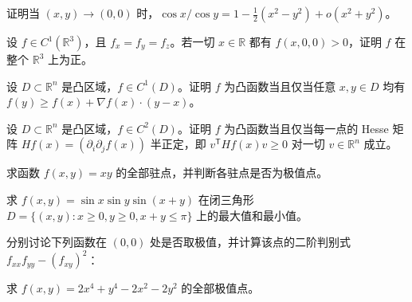 \noindent\begin{minipage}{\textwidth}
证明当 $(x,y)\to(0,0)$ 时，$\cos x/\cos y=1-\tfrac12(x^2-y^2)+o(x^2+y^2)$。
\end{minipage}\par\vfill
\noindent\begin{minipage}{\textwidth}
设 $f\in C^1(\mathbb R^3)$，且 $f_x=f_y=f_z$。若一切 $x\in\mathbb R$ 都有 $f(x,0,0)>0$，证明 $f$ 在整个 $\mathbb R^3$ 上为正。
\end{minipage}\par\vfill
\newpage
\noindent\begin{minipage}{\textwidth}
设 $D\subset\mathbb R^n$ 是凸区域，$f\in C^1(D)$。证明 $f$ 为凸函数当且仅当任意 $x,y\in D$ 均有 $f(y)\ge f(x)+\nabla f(x)\cdot(y-x)$。
\end{minipage}\par\vfill
\noindent\begin{minipage}{\textwidth}
设 $D\subset\mathbb R^n$ 是凸区域，$f\in C^2(D)$。证明 $f$ 为凸函数当且仅当每一点的 Hesse 矩阵 $Hf(x)=(\partial_i\partial_jf(x))$ 半正定，即 $v^{\mathsf T}Hf(x)v\ge0$ 对一切 $v\in\mathbb R^n$ 成立。
\end{minipage}\par\vfill
\noindent\begin{minipage}{\textwidth}
求函数 $f(x,y)=xy$ 的全部驻点，并判断各驻点是否为极值点。
\end{minipage}\par\vfill
\newpage
\noindent\begin{minipage}{\textwidth}
求 $f(x,y)=\sin x\sin y\sin(x+y)$ 在闭三角形 $D=\{(x,y):x\ge0,y\ge0,x+y\le\pi\}$ 上的最大值和最小值。
\end{minipage}\par\vfill
\noindent\begin{minipage}{\textwidth}
分别讨论下列函数在 $(0,0)$ 处是否取极值，并计算该点的二阶判别式 $f_{xx}f_{yy}-\left(f_{xy}\right)^2$：
\end{minipage}\par\vfill
\noindent\begin{minipage}{\textwidth}
求 $f(x,y)=2x^4+y^4-2x^2-2y^2$ 的全部极值点。
\end{minipage}\par\vfill
